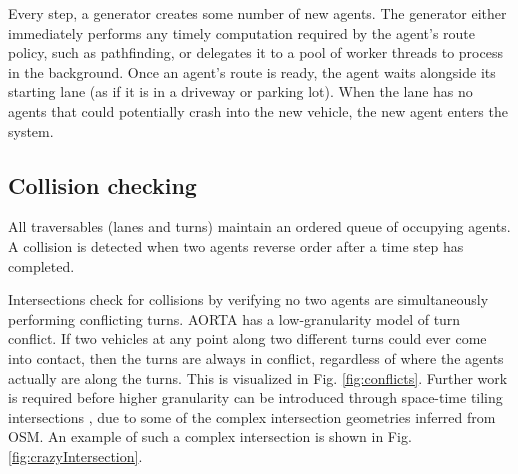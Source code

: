 \documentclass[letterpaper, 10 pt, conference]{ieeeconf}  %
\begin{document}
Every step, a generator creates some number of new agents. The generator either
immediately performs any timely computation required by the agent's route
policy, such as pathfinding, or delegates it to a pool of worker threads to
process in the background.  Once an agent's route is ready, the agent waits
alongside its starting lane (as if it is in a driveway or parking lot). When the
lane has no agents that could potentially crash into the new vehicle, the new
agent enters the system.

\subsection{Collision checking}

All traversables (lanes and turns) maintain an ordered queue of occupying
agents. A collision is detected when two agents reverse order after a time step
has completed.

Intersections check for collisions by verifying no two agents are simultaneously
performing conflicting turns. AORTA has a low-granularity model of turn
conflict. If two vehicles at any point along two different turns could ever come
into contact, then the turns are always in conflict, regardless of where the agents
actually are along the turns. This is visualized in Fig. \ref{fig:conflicts}.
Further work is required before higher granularity can be introduced through
space-time tiling intersections \cite{JAIR08-dresner}, due to some of the
complex intersection geometries inferred from OSM. An example of such a complex
intersection is shown in Fig. \ref{fig:crazyIntersection}.

\end{document}
